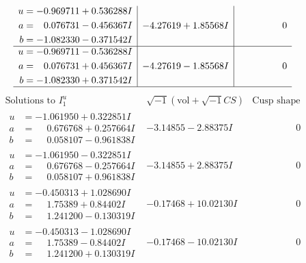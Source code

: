 \documentclass[1p]{elsarticle_modified}
\theoremstyle{definition}
\newcommand{\I}{\sqrt{-1}}
\begin{document}
$$\begin{array}{c|c|c}
\begin{aligned}
u &= -0.969711 + 0.536288 I \\
a &= \phantom{-}0.076731 - 0.456367 I \\
b &= -1.082330 - 0.371542 I\end{aligned}
 & -4.27619 + 1.85568 I & \phantom{-0.000000 } 0 \\ \hline\begin{aligned}
u &= -0.969711 - 0.536288 I \\
a &= \phantom{-}0.076731 + 0.456367 I \\
b &= -1.082330 + 0.371542 I\end{aligned}
 & -4.27619 - 1.85568 I & \phantom{-0.000000 } 0\\
 \hline 
 \end{array}$$\newpage$$\begin{array}{c|c|c}  
\text{Solutions to }I^u_{1}& \I (\text{vol} + \sqrt{-1}CS) & \text{Cusp shape}\\
 \hline 
\begin{aligned}
u &= -1.061950 + 0.322851 I \\
a &= \phantom{-}0.676768 + 0.257664 I \\
b &= \phantom{-}0.058107 - 0.961838 I\end{aligned}
 & -3.14855 - 2.88375 I & \phantom{-0.000000 } 0 \\ \hline\begin{aligned}
u &= -1.061950 - 0.322851 I \\
a &= \phantom{-}0.676768 - 0.257664 I \\
b &= \phantom{-}0.058107 + 0.961838 I\end{aligned}
 & -3.14855 + 2.88375 I & \phantom{-0.000000 } 0 \\ \hline\begin{aligned}
u &= -0.450313 + 1.028690 I \\
a &= \phantom{-}1.75389 + 0.84402 I \\
b &= \phantom{-}1.241200 - 0.130319 I\end{aligned}
 & -0.17468 + 10.02130 I & \phantom{-0.000000 } 0 \\ \hline\begin{aligned}
u &= -0.450313 - 1.028690 I \\
a &= \phantom{-}1.75389 - 0.84402 I \\
b &= \phantom{-}1.241200 + 0.130319 I\end{aligned}
 & -0.17468 - 10.02130 I & \phantom{-0.000000 } 0 \\ \hline\begin{aligned}

\end{aligned}
\end{array}$$
\end{document}

